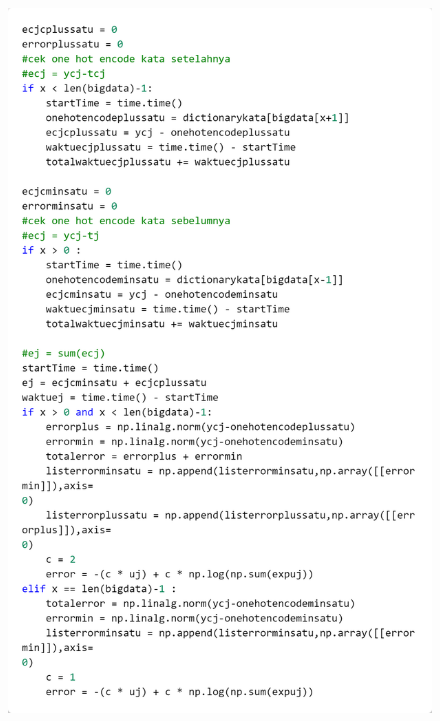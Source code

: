 \documentclass[12pt]{report}
\begin{document}
\begin{figure}[H]
\centering
\includegraphics[scale=0.3]{training4}
\end{figure}
\end{document}

